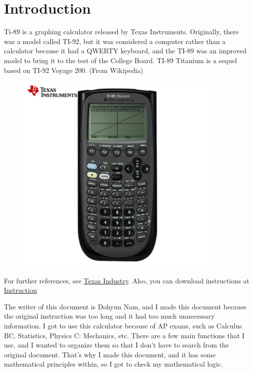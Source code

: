 \section{Introduction}

Ti-89 is a graphing calculator released by Texas Instruments. Originally, there was a model called TI-92, but it was considered a computer rather than a calculator because it had a QWERTY keyboard, and the TI-89 was an improved model to bring it to the test of the College Board. TI-89 Titanium is a sequel based on TI-92 Voyage 200. (From Wikipedia)


\begin{figure}[htbp]
    \centering
    \includegraphics[height=10cm]{images/Ti-89_Titanium.jpg}
    \label{Ti-89_Titanium}
\end{figure}

\noindent For further references, see \href{https://education.ti.com/en}{Texas Industry}. Also, you can download instructions at \href{https://education.ti.com/en/guidebook/details/en/FA1DC891957E4700B46A67255850C592/89ti}{Instruction}

The writer of this document is Dohyun Nam, and I made this document because the original instruction was too long and it had too much unnecessary information. I got to use this calculator because of AP exams, such as Calculus BC, Statistics, Physics C: Mechanics, etc. There are a few main functions that I use, and I wanted to organize them so that I don't have to search from the original document. That's why I made this document, and it has some mathematical principles within, so I got to check my mathematical logic. 